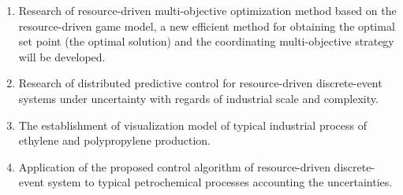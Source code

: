 \documentclass[conference]{IEEEtran}
\begin{document}
\begin{enumerate}

\item Research of resource-driven multi-objective optimization method based on the resource-driven game model, a new efficient method for obtaining the optimal set point (the optimal solution) and the coordinating multi-objective strategy will be developed. %
\item Research of distributed predictive control for resource-driven discrete-event systems under uncertainty with regards of industrial scale and complexity.
\item The establishment of visualization model of typical industrial process of ethylene and polypropylene production.
\item Application of the proposed control algorithm of resource-driven discrete-event system to typical petrochemical processes accounting the uncertainties.
\end{enumerate}
\end{document}
